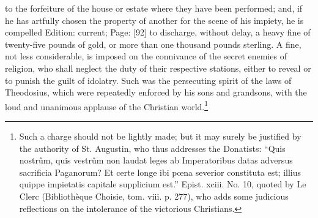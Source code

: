 to the forfeiture of the house or estate where they have been performed; and, if he has artfully chosen the property of another for the scene of his impiety, he is compelled Edition: current; Page: [92] to discharge, without delay, a heavy fine of twenty-five pounds of gold, or more than one thousand pounds sterling. A fine, not less considerable, is imposed on the connivance of the secret enemies of religion, who shall neglect the duty of their respective stations, either to reveal or to punish the guilt of idolatry. Such was the persecuting spirit of the laws of Theodosius, which were repeatedly enforced by his sons and grandsons, with the loud and unanimous applause of the Christian world.\footnote{Such a charge should not be lightly made; but it may surely be justified by the authority of St. Augustin, who thus addresses the Donatists: \texthebrew{“}Quis nostrûm, quis vestrûm non laudat leges ab Imperatoribus datas adversus sacrificia Paganorum? Et certe longe ibi pœna severior constituta est; illius quippe impietatis capitale supplicium est.\texthebrew{}” Epist. xciii. No. 10, quoted by Le Clerc (Bibliothèque Choisie, tom. viii. p. 277), who adds some judicious reflections on the intolerance of the victorious Christians.}

